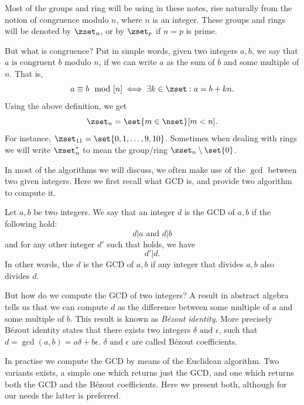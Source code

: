 \documentclass{subfiles}
\begin{document}
    Most of the groups and ring will be using in these notes,
        rise naturally from the notion of congruence modulo \(n\),
        where \(n\) is an integer. These groups and rings will be denoted by \(\zset_{n}\),
        or by \(\zset_{p}\) if \(n = p\) is prime.

    But what is congruence? Put in simple words, given two integers \(a, b\),
        we say that \(a \text{ is congruent } b\) modulo \(n\), 
        if we can write \(a\) as the sum of \(b\) and some multiple of \(n\).
        That is, 
        \[
            a \equiv b \mod[n] \iff \exists k \in \zset : a = b + kn.
        \]
        Using the above definition, we get
        \[
            \zset_{n} = \set{m \in \nset}[m < n].
        \]
        For instance, \(\zset_{11} = \set{0, 1, \ldots, 9, 10}\).
        Sometimes when dealing with rings we will write \(\zset_{n}^{*}\) to mean the group/ring
        \(\zset_{n} \setminus \set{0}\).

    In most of the algorithms we will discuss,
        we often make use of the \(\gcd\) between two given integers.
        Here we first recall what GCD is, and provide two algorithm to compute it.

    Let \(a, b\) be two integers.
        We say that an integer \(d\) is the GCD of \(a, b\) if the following hold:
        \begin{equation}\label{eq:gcd-definition}
            d \vert a \text{ and } d \vert b 
        \end{equation}
        and for any other integer \(d'\) such that  holds,
        we have
        \[
            d' \vert d.
        \]
        In other words, the \(d\) is the GCD of \(a, b\) if any integer that divides \(a, b\)
        also divides \(d\).

    But how do we compute the GCD of two integers? A result in abstract algebra tells us
        that we can compute \(d\) as the difference between some multiple of \(a\)
        and some multiple of \(b\). This result is known as \emph{Bézout identity}.
        More precisely Bézout identity states that there exists two integers \(\delta \text{ and } \epsilon\),
        such that \(d = \gcd(a, b) = a\delta + b\epsilon\).
        \(\delta \text{ and } \epsilon\) are called Bézout coefficients.

    In practise we compute the GCD by means of the Euclidean algorithm.
        Two variants exists, a simple one which returns just the GCD,
        and one which returns both the GCD and the Bézout coefficients.
        Here we present both, although for our needs the latter is preferred.

        
        
\end{document}
